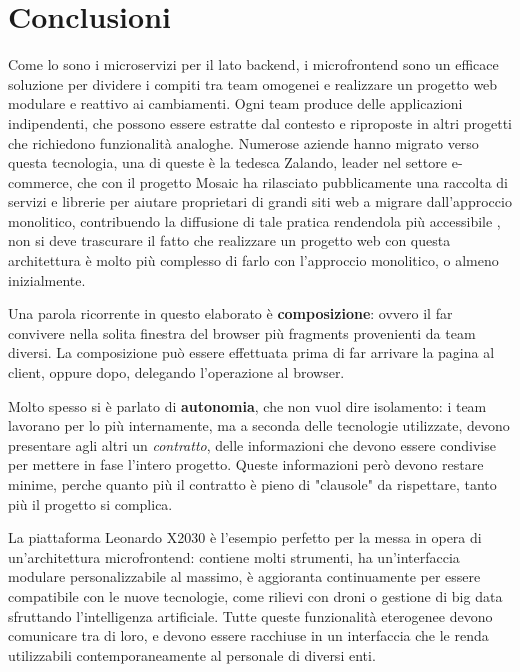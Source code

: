 \chapter{Conclusioni}\label{ch:conclusioni}
Come lo sono i microservizi per il lato backend, i microfrontend sono un efficace soluzione per dividere i compiti tra team omogenei
e realizzare un progetto web modulare e reattivo ai cambiamenti. Ogni team produce delle applicazioni indipendenti, 
che possono essere estratte dal contesto e riproposte in altri progetti che richiedono funzionalità analoghe.
Numerose aziende hanno migrato verso questa tecnologia, una di queste è la tedesca Zalando, leader nel settore e-commerce, che con
il progetto Mosaic ha rilasciato pubblicamente una raccolta di servizi e librerie per aiutare proprietari di grandi siti web a migrare 
dall'approccio monolitico, contribuendo la diffusione di tale pratica rendendola più accessibile \cite{mosaic}, non si deve trascurare il fatto che 
realizzare un progetto web con questa architettura è molto più complesso di farlo con l'approccio monolitico, o almeno inizialmente.

Una parola ricorrente in questo elaborato è \textbf{composizione}: ovvero il far convivere nella solita finestra del browser
più fragments provenienti da team diversi. La composizione può essere effettuata prima di far arrivare la pagina al client, oppure
dopo, delegando l'operazione al browser.

Molto spesso si è parlato di \textbf{autonomia}, che non vuol dire isolamento: i team lavorano per lo più internamente, ma 
a seconda delle tecnologie utilizzate, devono presentare agli altri un \emph{contratto}, delle informazioni che devono essere condivise
per mettere in fase l'intero progetto. Queste informazioni però devono restare minime, 
perche quanto più il contratto è pieno di "clausole" da rispettare, tanto più il progetto si complica.

La piattaforma Leonardo X2030 è l'esempio perfetto per la messa in opera di un'architettura microfrontend:
contiene molti strumenti, ha un'interfaccia modulare personalizzabile al massimo, è aggioranta continuamente
per essere compatibile con le nuove tecnologie, come rilievi con droni o gestione di big data sfruttando l'intelligenza artificiale.
Tutte queste funzionalità eterogenee devono comunicare tra di loro, e devono essere racchiuse in un interfaccia che le
renda utilizzabili contemporaneamente al personale di diversi enti.

